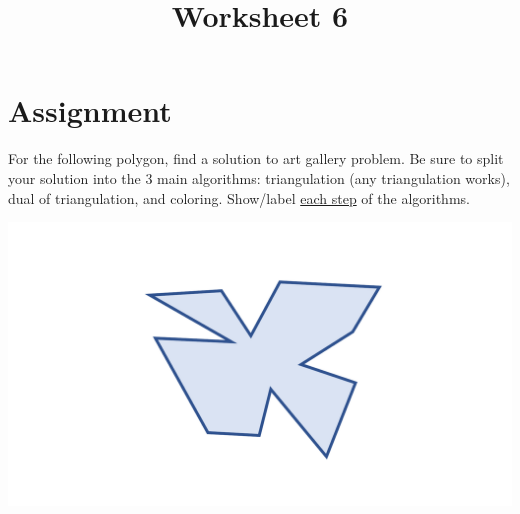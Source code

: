 \documentclass[a4paper,12pt]{article}
\title{Worksheet 6}
\begin{document}
\maketitle

\worksheetGroundRules

\worksheetSubmission


\vspace{5pt}
\section{Assignment}

For the following polygon, find a solution to art gallery problem. Be sure to split your solution into the 3 main algorithms: triangulation (any triangulation works), dual of triangulation, and coloring. Show/label \uline{each step} of the algorithms. 


\begin{center}
\includegraphics[width=0.75\linewidth]{../images/worksheet3.pdf}
\end{center}



\newpage
\end{document}
